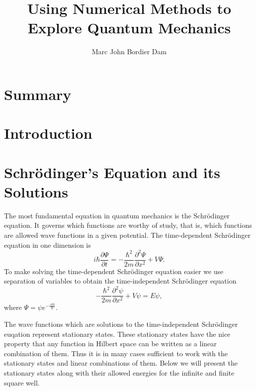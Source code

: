 \documentclass[12pt,a4paper]{article}
\author{Marc John Bordier Dam}
\title{Using Numerical Methods to Explore Quantum Mechanics}
\newcommand{\pdiff}[2]{\frac{\partial #1}{\partial #2}}
\newcommand{\pdiffn}[3]{\frac{\partial^{#3} #1}{\partial #2^{#3}}}
\begin{document}
\maketitle

\section{Summary}

\section{Introduction}

\section{Schrödinger's Equation and its Solutions}
The most fundamental equation in quantum mechanics is the Schrödinger equation. It governs which functions are worthy of study, that is, which functions are allowed wave functions in a given potential. The time-dependent Schrödinger equation in one dimension is
\begin{equation}
i \hbar \pdiff{\Psi}{t} = - \frac{\hbar^2}{2 m} \pdiffn{\Psi}{x}{2} + V \Psi.
\end{equation}
To make solving the time-dependent Schrödinger equation easier we use separation of variables to obtain the time-independent Schrödinger equation
\begin{equation}
- \frac{\hbar^2}{2 m} \pdiffn{\psi}{x}{2} + V \psi = E \psi,
\end{equation}
where $\Psi = \psi e^{-\frac{i E t}{\hbar}}$.

The wave functions which are solutions to the time-independent Schrödinger euqation represent stationary states. These stationary states have the nice property that any function in Hilbert space can be written as a linear combination of them. Thus it is in many cases sufficient to work with the stationary states and linear combinations of them. Below we will present the stationary states along with their allowed energies for the infinite and finite square well.
\end{document}
